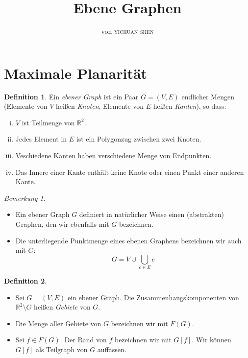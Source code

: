 \documentclass[10pt,b5paper]{article}
\author{von \textsc{yichuan shen}}
\title{Ebene Graphen}
\begin{document}
\theoremstyle{plain}
\theoremstyle{definition}
\newtheorem{theorem}{Theorem}
\newtheorem{lemma}[theorem]{Lemma}
\newtheorem{proposition}[theorem]{Satz}
\newtheorem{corollary}[theorem]{Korollar}
\theoremstyle{definition}
\newtheorem*{definition}{Definition}
\newtheorem*{example}{Beispiel}
\theoremstyle{remark}
\newtheorem*{remark}{Bemerkung}

\maketitle

\section{Maximale Planarität}

\begin{definition}
Ein \textit{ebener Graph} ist ein Paar $G= (V, E)$ endlicher Mengen (Elemente von $V$ heißen \textit{Knoten}, Elemente von $E$ heißen \textit{Kanten}), so dass:
\begin{enumerate}[(i)]
\item $V$ ist Teilmenge von $\mathbb{R}^2$.
\item Jedes Element in $E$ ist ein Polygonzug zwischen zwei Knoten.
\item  Veschiedene Kanten haben verschiedene Menge von Endpunkten.
\item Das Innere einer Kante enthält keine Knote oder einen Punkt einer anderen Kante.
\end{enumerate}
\end{definition}

\begin{remark}
\begin{itemize}
\item  Ein ebener Graph $G$ definiert in natürlicher Weise einen (abstrakten) Graphen, den wir ebenfalls mit $G$ bezeichnen.
\item Die unterliegende Punktmenge eines ebenen Graphens bezeichnen wir auch mit $G$:
\[ G = V \cup\bigcup_{e\in E}e \]
\end{itemize}
\end{remark}

\begin{definition}
\begin{itemize}
\item Sei $G = (V, E)$ ein ebener Graph. Die Zusammenhangskomponenten von $\mathbb{R}^2\setminus G$ heißen \textit{Gebiete} von $G$. 
\item Die Menge aller Gebiete von $G$ bezeichnen wir mit $F(G)$.
\item Sei $f\in F(G)$. Der Rand von $f$ bezeichnen wir mit $G[f]$. Wir können $G[f]$ als Teilgraph von $G$ auffassen.
\end{itemize}
\end{definition}
\end{document}
